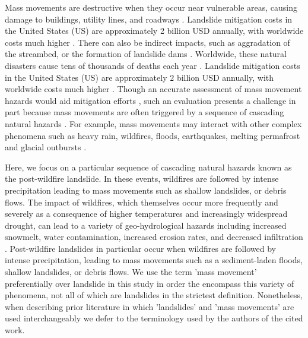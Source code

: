 \documentclass[nhess, manuscript]{copernicus}
\begin{document}
Mass movements are destructive when they occur near vulnerable areas, causing damage to buildings, utility lines, and roadways \citep{highlandLandslideHandbookGuide2008}. Landslide mitigation costs in the United States (US) are approximately 2 billion USD annually, with worldwide costs much higher \citep{schusterSocioeconomicEnvironmentalImpacts2001}. There can also be indirect impacts, such as aggradation of the streambed, or the formation of landslide dams \citep{glade2005nature}. Worldwide, these natural disasters cause tens of thousands
of deaths each year \citep{froudeGlobalFatalLandslide2018}. Landslide mitigation
costs in the United States (US) are approximately \(2\) billion USD annually, with
worldwide costs much higher \citep{schusterSocioeconomicEnvironmentalImpacts2001}. Though an
accurate assessment of mass movement hazards would aid mitigation efforts
\citep{spikerNationalLandslideHazards2002}, such an evaluation presents a challenge in part because mass movements are often triggered by a sequence of cascading
natural hazards \citep{kloseIntroduction2015}. For example, mass movements may interact with other complex phenomena such as heavy rain, wildfires, floods, earthquakes, melting permafrost
and glacial outbursts \citep{budimirSystematicReviewLandslide2015, harpLandslideInventoriesEssential2011, kirschbaumChangesExtremePrecipitation2020, kirschbaumAdvancesLandslideNowcasting2012, rupertUsingLogisticRegression2003}. 

Here, we focus on a particular sequence of cascading natural hazards known as the post-wildfire landslide. In these events, wildfires are followed by intense precipitation leading to mass movements such as shallow landslides, or debris flows. The impact of wildfires, which themselves occur more frequently and severely as a consequence of higher temperatures and increasingly widespread drought, can lead to a variety of geo-hydrological hazards including increased snowmelt, water contamination, increased erosion rates, and decreased infiltration \citep{aghakouchak2020climate}. Post-wildfire landslides in particular occur when wildfires are followed by intense precipitation, leading to mass movements such as a sediment-laden floods, shallow landslides, or debris flows. We use the term 'mass movement' 
preferentially over landslide in this study in order the encompass this variety 
of phenomena, not all of which are landslides in the strictest definition. Nonetheless, 
when describing prior literature in which 'landslides' and 'mass movements' are used interchangeably we defer to the terminology used by the authors of the cited work. 
\end{document}
